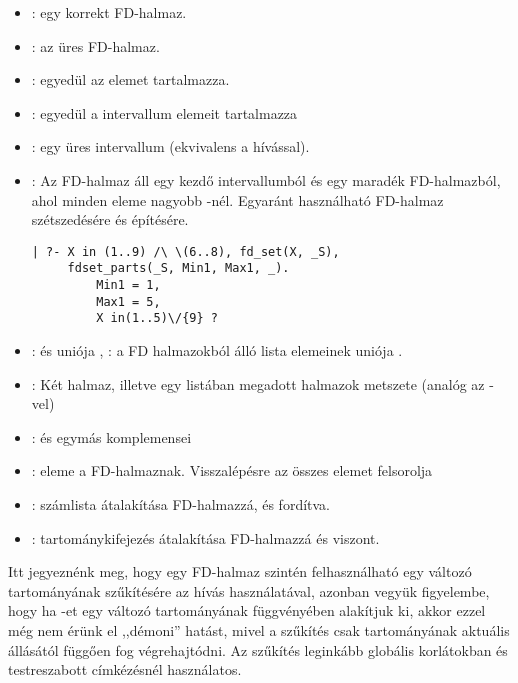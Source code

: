 \begin{itemize}
\item {}:  egy korrekt FD-halmaz.
\item {}:  az üres FD-halmaz.
\item {}:  egyedül az  elemet tartalmazza.
\item {}:  egyedül a 
intervallum elemeit tartalmazza
\item {}:  egy üres intervallum
(ekvivalens a  hívással).
\item {}: Az  FD-halmaz áll egy
 kezdő intervallumból és egy  maradék FD-halmazból, ahol
 minden eleme nagyobb -nél. Egyaránt használható
FD-halmaz szétszedésére és építésére.
\begin{verbatim}
| ?- X in (1..9) /\ \(6..8), fd_set(X, _S), 
     fdset_parts(_S, Min1, Max1, _).
         Min1 = 1, 
         Max1 = 5, 
         X in(1..5)\/{9} ? 
\end{verbatim}
\item {}:  és 
uniója ,  
: a  FD halmazokból
álló lista elemeinek uniója .
\item {} : Két halmaz, illetve egy listában
megadott halmazok metszete (analóg az -vel)
\item {}:  és  egymás
komplemensei
\item {}:  eleme a  FD-halmaznak.
Visszalépésre az összes elemet felsorolja
\item {}: számlista
átalakítása FD-halmazzá, és fordítva.
\item {}:
tartománykifejezés átalakítása FD-halmazzá és viszont.
\end{itemize}

Itt jegyeznénk meg, hogy egy FD-halmaz szintén felhasználható egy változó
tartományának szűkítésére az  hívás használatával, azonban
vegyük figyelembe, hogy ha -et egy  változó tartományának
függvényében alakítjuk ki, akkor ezzel még nem érünk el ,,démoni'' hatást,
mivel a szűkítés csak  tartományának aktuális állásától függően
fog végrehajtódni. Az  szűkítés leginkább globális korlátokban
és testreszabott címkézésnél használatos.

